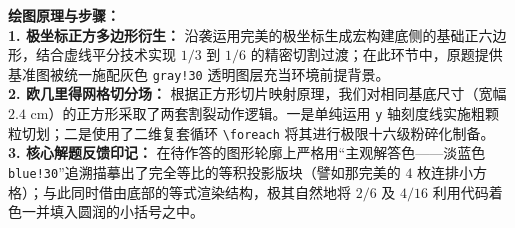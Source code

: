 \documentclass[12pt, a4paper]{ctexrep}
\begin{document}
\vspace{0.4cm}
{\small\color{blue!70!black}
\textbf{绘图原理与步骤：}\\
\textbf{1. 极坐标正方多边形衍生：} 沿袭运用完美的极坐标生成宏构建底侧的基础正六边形，结合虚线平分技术实现 $1/3$ 到 $1/6$ 的精密切割过渡；在此环节中，原题提供基准图被统一施配灰色 \texttt{gray!30} 透明图层充当环境前提背景。\\
\textbf{2. 欧几里得网格切分场：} 根据正方形切片映射原理，我们对相同基底尺寸（宽幅 $2.4\text{ cm}$）的正方形采取了两套割裂动作逻辑。一是单纯运用 \texttt{y} 轴刻度线实施粗颗粒切划；二是使用了二维复套循环 \texttt{\textbackslash foreach} 将其进行极限十六级粉碎化制备。\\
\textbf{3. 核心解题反馈印记：} 在待作答的图形轮廓上严格用“主观解答色——淡蓝色 \texttt{blue!30}”追溯描摹出了完全等比的等积投影版块（譬如那完美的 $4$ 枚连排小方格）；与此同时借由底部的等式渲染结构，极其自然地将 $2/6$ 及 $4/16$ 利用代码着色一并填入圆润的小括号之中。
}
\end{document}
